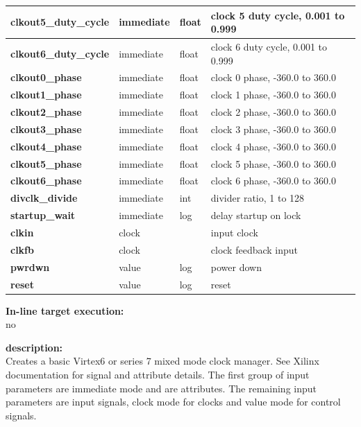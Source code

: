 \begin{tabular}{| l | l | l | l |}
            {\bf clkout5\_duty\_cycle}    & immediate & float & clock 5 duty cycle, 0.001 to 0.999\\ \hline
            {\bf clkout6\_duty\_cycle}    & immediate & float & clock 6 duty cycle, 0.001 to 0.999\\ \hline
            {\bf clkout0\_phase}          & immediate & float & clock 0 phase, -360.0 to 360.0\\ \hline
            {\bf clkout1\_phase}          & immediate & float & clock 1 phase, -360.0 to 360.0\\ \hline
            {\bf clkout2\_phase}          & immediate & float & clock 2 phase, -360.0 to 360.0\\ \hline
            {\bf clkout3\_phase}          & immediate & float & clock 3 phase, -360.0 to 360.0\\ \hline
            {\bf clkout4\_phase}          & immediate & float & clock 4 phase, -360.0 to 360.0\\ \hline
            {\bf clkout5\_phase}          & immediate & float & clock 5 phase, -360.0 to 360.0\\ \hline
            {\bf clkout6\_phase}          & immediate & float & clock 6 phase, -360.0 to 360.0\\ \hline
            {\bf divclk\_divide}          & immediate & int   & divider ratio, 1 to 128 \\ \hline
            {\bf startup\_wait}           & immediate & log   & delay startup on lock \\ \hline
            {\bf clkin}                   & clock     &       & input clock   \\ \hline 
            {\bf clkfb}                   & clock     &       & clock feedback input   \\ \hline
            {\bf pwrdwn}                  & value     & log   & power down  \\ \hline
            {\bf reset}                   & value     & log   & reset  \\ \hline
            \end{tabular}

            {\bf In-line target execution:} \\
            no

            {\bf description:} \\
            Creates a basic Virtex6 or series 7 mixed mode clock manager. See Xilinx
            documentation for signal and attribute details. The first group of input
            parameters are immediate mode and are attributes. The remaining input
            parameters are input signals, clock mode for clocks and value mode for
            control signals.



